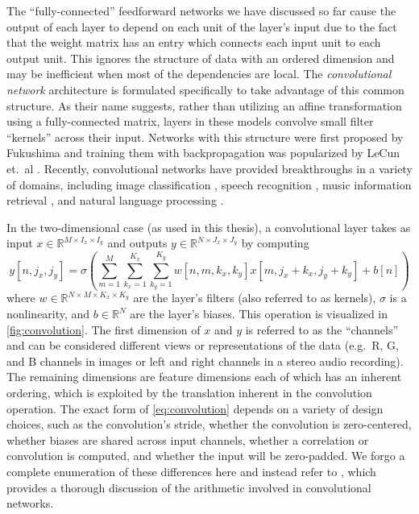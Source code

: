 The ``fully-connected'' feedforward networks we have discussed so far cause the output of each layer to depend on each unit of the layer's input due to the fact that the weight matrix has an entry which connects each input unit to each output unit.
This ignores the structure of data with an ordered dimension and may be inefficient when most of the dependencies are local.
The {\em convolutional network} architecture is formulated specifically to take advantage of this common structure.
As their name suggests, rather than utilizing an affine transformation using a fully-connected matrix, layers in these models convolve small filter ``kernels'' across their input.
Networks with this structure were first proposed by Fukushima \cite{fukushima1980neocognitron} and training them with backpropagation was popularized by LeCun et.\ al \cite{lecun1989backpropagation}.
Recently, convolutional networks have provided breakthroughs in a variety of domains, including image classification \cite{krizhevsky2012imagenet,he2015delving,szegedy2015going}, speech recognition \cite{abdel2012applying,sainath2013deep}, music information retrieval \cite{humphrey2012rethinking,van2013deep,schluter2014improved,ullrich2014boundary,mcfee2015software,schluter2015exploring}, and natural language processing \cite{kim2014convolutional,zhang2015text}.

In the two-dimensional case (as used in this thesis), a convolutional layer takes as input $x \in \mathbb{R}^{M \times I_x \times I_y}$ and outputs $y \in \mathbb{R}^{N \times J_x \times J_y}$ by computing
\begin{equation}
        y[n, j_x, j_y] = \sigma\left(\sum_{m = 1}^M \sum_{k_x = 1}^{K_x} \sum_{k_y = 1}^{K_y} w[n, m, k_x, k_y] x[m, j_x + k_x, j_y + k_y] + b[n]\right)
\label{eq:convolution}
\end{equation}
where $w \in \mathbb{R}^{N \times M \times K_x \times K_y}$ are the layer's filters (also referred to as kernels), $\sigma$ is a nonlinearity, and $b \in \mathbb{R}^N$ are the layer's biases.
This operation is visualized in \cref{fig:convolution}.
The first dimension of $x$ and $y$ is referred to as the ``channels'' and can be considered different views or representations of the data (e.g.\ R, G, and B channels in images or left and right channels in a stereo audio recording).
The remaining dimensions are feature dimensions each of which has an inherent ordering, which is exploited by the translation inherent in the convolution operation.
The exact form of \cref{eq:convolution} depends on a variety of design choices, such as the convolution's stride, whether the convolution is zero-centered, whether biases are shared across input channels, whether a correlation or convolution is computed, and whether the input will be zero-padded.
We forgo a complete enumeration of these differences here and instead refer to \cite{dumoulin2016guide}, which provides a thorough discussion of the arithmetic involved in convolutional networks.

